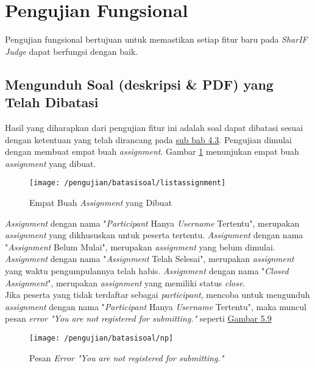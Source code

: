 \section{Pengujian Fungsional}
Pengujian fungsional bertujuan untuk memastikan setiap fitur baru pada \textit{SharIF Judge} dapat berfungsi dengan baik.
	\subsection{Mengunduh Soal (deskripsi \& PDF) yang Telah Dibatasi} 
	Hasil yang diharapkan dari pengujian fitur ini adalah soal dapat dibatasi sesuai dengan ketentuan yang telah dirancang pada \hyperref[chap:batassoal]{sub bab 4.3}. Pengujian dimulai dengan membuat empat buah \textit{assignment}. Gambar \ref{fig:listassignment} menunjukan empat buah \textit{assignment} yang dibuat.
	\begin{figure}[H]
		\centering  
		\texttt{[image: /pengujian/batasisoal/listassignment]}  
		\caption[Empat Buah \textit{Assignment} yang Dibuat]{Empat Buah \textit{Assignment} yang Dibuat} 
		\label{fig:listassignment} 
	\end{figure}
	
	\textit{Assignment} dengan nama "\textit{Participant} Hanya \textit{Username} Tertentu", merupakan \textit{assignment} yang dikhususkan untuk peserta tertentu. \textit{Assignment} dengan nama "\textit{Assignment} Belum Mulai", merupakan \textit{assignment} yang belum dimulai. \textit{Assignment} dengan nama "\textit{Assignment} Telah Selesai", merupakan \textit{assignment} yang waktu pengumpulannya telah habis. \textit{Assignment} dengan nama "\textit{Closed Assignment}", merupakan \textit{assignment} yang memiliki status \textit{close}. \\
	
	Jika peserta yang tidak terdaftar sebagai \textit{participant}, mencoba untuk mengunduh \textit{assignment} dengan nama "\textit{Participant} Hanya \textit{Username} Tertentu", maka muncul pesan \textit{error "You are not registered for submitting."} seperti \hyperref[fig:np]{Gambar 5.9} 
	\begin{figure}[H]
		\centering  
		\texttt{[image: /pengujian/batasisoal/np]}  
		\caption[Pesan \textit{Error "You are not registered for submitting."}]{Pesan \textit{Error "You are not registered for submitting."}} 
		\label{fig:np} 
	\end{figure}

